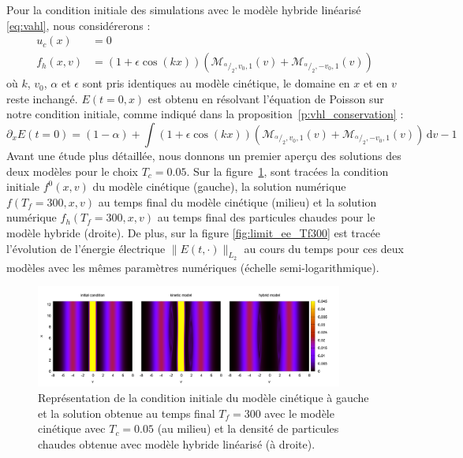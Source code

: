 Pour la condition initiale des simulations avec le modèle hybride linéarisé \eqref{eq:vahl}, nous considérerons :
\begin{equation}
  \begin{aligned}
    u_c(x)   & = 0 \\
    f_h(x,v) & = (1+\epsilon\cos(kx))\left( \mathcal{M}_{^\alpha/_2,v_0,1}(v) + \mathcal{M}_{^\alpha/_2,-v_0,1}(v) \right)
  \end{aligned}
\label{eq:HL:init}
\end{equation}
où $k$, $v_0$, $\alpha$ et $\epsilon$ sont pris identiques au modèle cinétique, le domaine en $x$ et en $v$ reste inchangé. $E(t=0,x)$ est obtenu en résolvant l'équation de Poisson sur notre condition initiale, comme indiqué dans la proposition~\ref{p:vhl_conservation} :
$$
  \partial_x E(t=0) = (1-\alpha) + \int (1+\epsilon\cos(kx))\left( \mathcal{M}_{^\alpha/_2,v_0,1}(v) + \mathcal{M}_{^\alpha/_2,-v_0,1}(v) \right)\,\mathrm{d}v - 1
$$
Avant une étude plus détaillée, nous donnons un premier aperçu des solutions des deux modèles pour le choix $T_c=0.05$. 
Sur la figure~\ref{fig:limit_vp}, 
sont trac\'ees la condition initiale $f^0(x, v)$ du modèle cinétique (gauche), la solution numérique  $f(T_f=300, x, v)$ au temps final 
du modèle cinétique (milieu) et la solution num\'erique $f_h(T_f=300, x, v)$ au temps final des particules chaudes pour le modèle hybride (droite).  De plus, sur la figure \ref{fig:limit_ee_Tf300} est trac\'ee l'évolution de l'énergie électrique $\|E(t, \cdot)\|_{L_2}$ 
au cours du temps pour ces deux modèles avec les mêmes paramètres numériques (échelle semi-logarithmique). 
\begin{figure}[h]
  \centering
  \includegraphics[width=0.9\textwidth]{img/limit_vp.png}
  \caption{Représentation de la condition initiale du modèle cinétique à gauche et la solution obtenue au temps final $T_f=300$ avec le modèle cinétique avec $T_c = 0.05$ (au milieu) et la densité de particules chaudes obtenue avec modèle hybride linéarisé (à droite).}
  \label{fig:limit_vp}
\end{figure}
